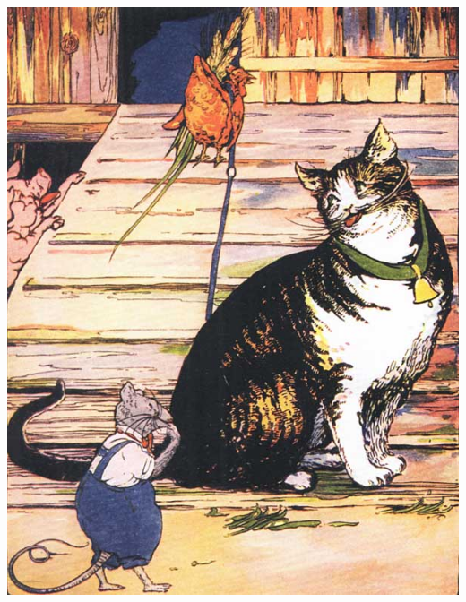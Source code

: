 \documentclass[letterpaper, 10pt, openany]{memoir}
\begin{document}
\newpage
\begin{center}
	\includegraphics[width=\textwidth]{image_049_1.jpg}
\end{center}
\end{document}
